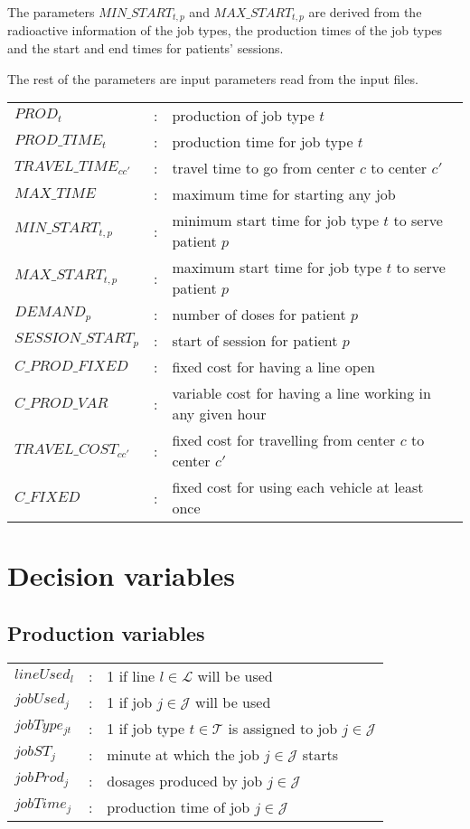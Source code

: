 The parameters $MIN\_START_{t,p}$ and $MAX\_START_{t,p}$ are derived from the radioactive information of the job types, the production times of the job types and the start and end times for patients' sessions.

The rest of the parameters are input parameters read from the input files.

\begin{tabular}{p{40mm}lp{80mm}}
$PROD_t$ 								& : &		production of job type $t$ \\
$PROD\_TIME_t$ 					& : &	production time for job type $t$ \\
$TRAVEL\_TIME_{cc'}$ 		& : &	travel time to go from center $c$ to center $c'$ \\
$MAX\_TIME$ 						& : & maximum time for starting any job \\
$MIN\_START_{t,p}$ 			& : & minimum start time for job type $t$ to serve patient $p$ \\
$MAX\_START_{t,p}$ 			& : & maximum start time for job type $t$ to serve patient $p$ \\
$DEMAND_p$ 							& : & number of doses for patient $p$ \\
$SESSION\_START_p$ 			& : & start of session for patient $p$ \\
$C\_PROD\_FIXED$				& : & fixed cost for having a line open \\
$C\_PROD\_VAR$					& : & variable cost for having a line working in any given hour \\
$TRAVEL\_COST_{cc'}$		& : & fixed cost for travelling from center $c$ to center $c'$\\
$C\_FIXED$							& : & fixed cost for using each vehicle at least once\\
\end{tabular}
\bigskip


\section{Decision variables}

\subsection{Production variables}

\begin{tabular}{p{30mm}lp{90mm}}
    $lineUsed_{l}$    & : & 1 if line $l \in \mathcal{L}$ will be used  \\  
    $jobUsed_{j}$    	& : & 1 if job $j \in \mathcal{J}$ will be used  \\  
    $jobType_{jt}$    & : & 1 if job type $t \in \mathcal{T}$ is assigned to job $j \in \mathcal{J}$ \\  
    $jobST_{j}$    		& : & minute at which the job $j \in \mathcal{J}$ starts \\  
    $jobProd_{j}$   	& : & dosages produced by job $j \in \mathcal{J}$ \\  
    $jobTime_{j}$   	& : & production time of job $j \in \mathcal{J}$ \\  
\end{tabular}
\bigskip

